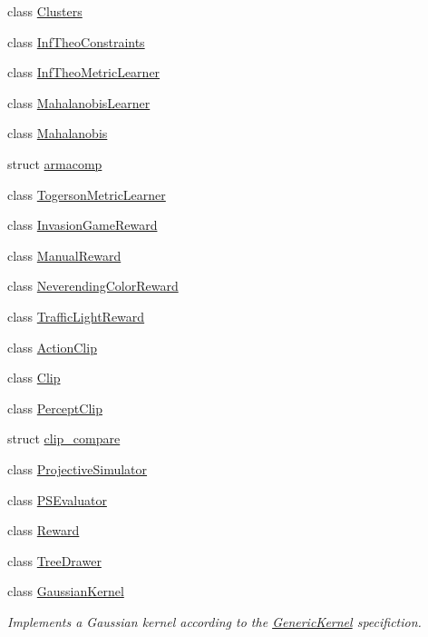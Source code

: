 \begin{DoxyCompactItemize}
\item 
class \hyperlink{classkukadu_1_1Clusters}{Clusters}
\item 
class \hyperlink{classkukadu_1_1InfTheoConstraints}{Inf\-Theo\-Constraints}
\item 
class \hyperlink{classkukadu_1_1InfTheoMetricLearner}{Inf\-Theo\-Metric\-Learner}
\item 
class \hyperlink{classkukadu_1_1MahalanobisLearner}{Mahalanobis\-Learner}
\item 
class \hyperlink{classkukadu_1_1Mahalanobis}{Mahalanobis}
\item 
struct \hyperlink{structkukadu_1_1armacomp}{armacomp}
\item 
class \hyperlink{classkukadu_1_1TogersonMetricLearner}{Togerson\-Metric\-Learner}
\item 
class \hyperlink{classkukadu_1_1InvasionGameReward}{Invasion\-Game\-Reward}
\item 
class \hyperlink{classkukadu_1_1ManualReward}{Manual\-Reward}
\item 
class \hyperlink{classkukadu_1_1NeverendingColorReward}{Neverending\-Color\-Reward}
\item 
class \hyperlink{classkukadu_1_1TrafficLightReward}{Traffic\-Light\-Reward}
\item 
class \hyperlink{classkukadu_1_1ActionClip}{Action\-Clip}
\item 
class \hyperlink{classkukadu_1_1Clip}{Clip}
\item 
class \hyperlink{classkukadu_1_1PerceptClip}{Percept\-Clip}
\item 
struct \hyperlink{structkukadu_1_1clip__compare}{clip\-\_\-compare}
\item 
class \hyperlink{classkukadu_1_1ProjectiveSimulator}{Projective\-Simulator}
\item 
class \hyperlink{classkukadu_1_1PSEvaluator}{P\-S\-Evaluator}
\item 
class \hyperlink{classkukadu_1_1Reward}{Reward}
\item 
class \hyperlink{classkukadu_1_1TreeDrawer}{Tree\-Drawer}
\item 
class \hyperlink{classkukadu_1_1GaussianKernel}{Gaussian\-Kernel}
\begin{DoxyCompactList}\small\item\em Implements a Gaussian kernel according to the \hyperlink{classkukadu_1_1GenericKernel}{Generic\-Kernel} specifiction. \end{DoxyCompactList}\item 

\end{DoxyCompactItemize}
